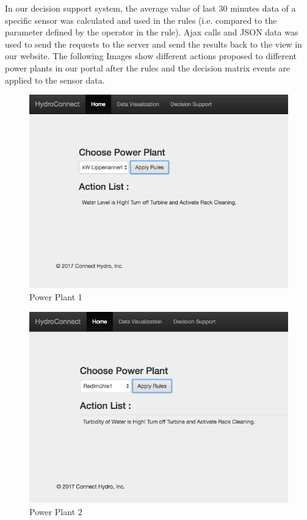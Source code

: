 In our decision support system, the average value of last 30 minutes data of a specific sensor was calculated and used in the rules (i.e. compared to the parameter defined by the operator in the rule). Ajax calls and JSON data was used to send the requests to the server and send the results back to the view in our website. The following Images show different actions proposed to different power plants in our portal after the rules and the decision matrix events are applied to the sensor data.
\begin{figure}[H]
\centering
\includegraphics[scale=0.6]{Images/Screen1.png}
\caption[Power Plant 1]{Power Plant 1}
\end{figure}
\begin{figure}[H]
\centering
\includegraphics[scale=0.6]{Images/Screen2.png}
\caption[Power Plant 2]{Power Plant 2}
\end{figure}
